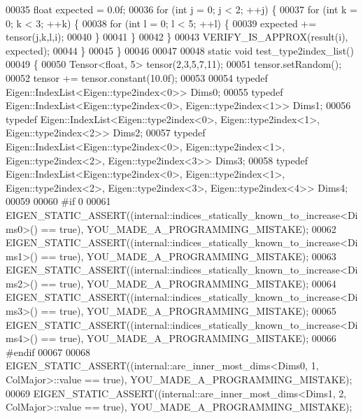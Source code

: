 \begin{DoxyCode}
00035     \textcolor{keywordtype}{float} expected = 0.0f;
00036     \textcolor{keywordflow}{for} (\textcolor{keywordtype}{int} j = 0; j < 2; ++j) \{
00037       \textcolor{keywordflow}{for} (\textcolor{keywordtype}{int} k = 0; k < 3; ++k) \{
00038         \textcolor{keywordflow}{for} (\textcolor{keywordtype}{int} l = 0; l < 5; ++l) \{
00039           expected += tensor(j,k,l,i);
00040         \}
00041       \}
00042     \}
00043     VERIFY\_IS\_APPROX(result(i), expected);
00044   \}
00045 \}
00046 
00047 
00048 \textcolor{keyword}{static} \textcolor{keywordtype}{void} test\_type2index\_list()
00049 \{
00050   Tensor<float, 5> tensor(2,3,5,7,11);
00051   tensor.setRandom();
00052   tensor += tensor.constant(10.0f);
00053 
00054   \textcolor{keyword}{typedef} Eigen::IndexList<Eigen::type2index<0>> Dims0;
00055   \textcolor{keyword}{typedef} Eigen::IndexList<Eigen::type2index<0>, Eigen::type2index<1>> Dims1;
00056   \textcolor{keyword}{typedef} Eigen::IndexList<Eigen::type2index<0>, Eigen::type2index<1>, Eigen::type2index<2>> Dims2;
00057   \textcolor{keyword}{typedef} Eigen::IndexList<Eigen::type2index<0>, Eigen::type2index<1>, Eigen::type2index<2>, 
      Eigen::type2index<3>> Dims3;
00058   \textcolor{keyword}{typedef} Eigen::IndexList<Eigen::type2index<0>, Eigen::type2index<1>, Eigen::type2index<2>, 
      Eigen::type2index<3>, Eigen::type2index<4>> Dims4;
00059 
00060 \textcolor{preprocessor}{#if 0}
00061   EIGEN\_STATIC\_ASSERT((internal::indices\_statically\_known\_to\_increase<Dims0>() == \textcolor{keyword}{true}), 
      YOU\_MADE\_A\_PROGRAMMING\_MISTAKE);
00062   EIGEN\_STATIC\_ASSERT((internal::indices\_statically\_known\_to\_increase<Dims1>() == \textcolor{keyword}{true}), 
      YOU\_MADE\_A\_PROGRAMMING\_MISTAKE);
00063   EIGEN\_STATIC\_ASSERT((internal::indices\_statically\_known\_to\_increase<Dims2>() == \textcolor{keyword}{true}), 
      YOU\_MADE\_A\_PROGRAMMING\_MISTAKE);
00064   EIGEN\_STATIC\_ASSERT((internal::indices\_statically\_known\_to\_increase<Dims3>() == \textcolor{keyword}{true}), 
      YOU\_MADE\_A\_PROGRAMMING\_MISTAKE);
00065   EIGEN\_STATIC\_ASSERT((internal::indices\_statically\_known\_to\_increase<Dims4>() == \textcolor{keyword}{true}), 
      YOU\_MADE\_A\_PROGRAMMING\_MISTAKE);
00066 \textcolor{preprocessor}{#endif}
00067 
00068   EIGEN\_STATIC\_ASSERT((internal::are\_inner\_most\_dims<Dims0, 1, ColMajor>::value == \textcolor{keyword}{true}), 
      YOU\_MADE\_A\_PROGRAMMING\_MISTAKE);
00069   EIGEN\_STATIC\_ASSERT((internal::are\_inner\_most\_dims<Dims1, 2, ColMajor>::value == \textcolor{keyword}{true}), 
      YOU\_MADE\_A\_PROGRAMMING\_MISTAKE);

\end{DoxyCode}
